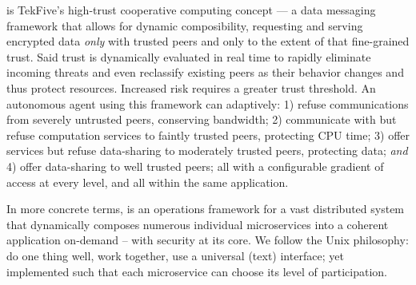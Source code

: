 \textbf{\projectName}is TekFive's high-trust cooperative computing concept --- a data messaging framework that allows for dynamic composibility, requesting and serving encrypted data \textit{only} with trusted peers and only to the extent of that fine-grained trust.
Said trust is dynamically evaluated in real time to rapidly eliminate incoming threats and even reclassify existing peers as their behavior changes and thus protect resources.
Increased risk requires a greater trust threshold.
An autonomous agent using this framework can adaptively: 1) refuse communications from severely untrusted peers, conserving bandwidth; 2) communicate with but refuse computation services to faintly trusted peers, protecting CPU time; 3) offer services but refuse data-sharing to moderately trusted peers, protecting data; \textit{and} 4) offer data-sharing to well trusted peers; all with a configurable gradient of access at every level, and all within the same application.

In more concrete terms, \projectName is an operations framework for a vast distributed system that dynamically composes numerous individual microservices into a coherent application on-demand -- with security at its core.
We follow the Unix philosophy: do one thing well, work together, use a universal (text) interface; yet implemented such that each microservice can choose its level of participation.
